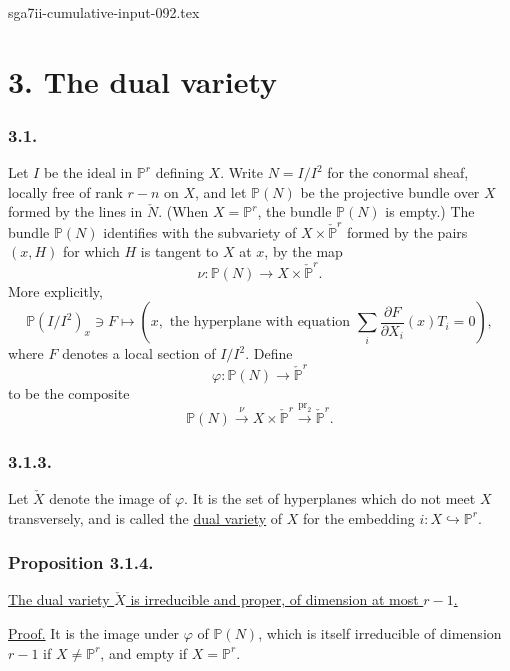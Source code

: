 \begin{filecontents*}{sga7ii-cumulative-input-092.tex}
\section*{3. The dual variety}

\subsubsection*{3.1.}
Let $I$ be the ideal in $\mathbb P^r$ defining $X$.  Write
$N=I/I^2$ for the conormal sheaf, locally free of rank $r-n$ on $X$,
and let $\mathbb P(N)$ be the projective bundle over $X$ formed by the
lines in $\check N$.  (When $X=\mathbb P^r$, the bundle
$\mathbb P(N)$ is empty.)  The bundle $\mathbb P(N)$ identifies with
the subvariety of $X\times\check{\mathbb P}^{r}$ formed by the pairs
$(x,H)$ for which $H$ is tangent to $X$ at $x$, by the map
\[
\nu:\mathbb P(N)\longrightarrow X\times\check{\mathbb P}^{r}.
\]
More explicitly,
\begin{equation}\tag{3.1.1}
\mathbb P(I/I^2)_x\ni F\longmapsto
\left(x,\text{ the hyperplane with equation }
\sum_i\frac{\partial F}{\partial X_i}(x)T_i=0\right),
\end{equation}
where $F$ denotes a local section of $I/I^2$.  Define
\begin{equation}\tag{3.1.2}
\varphi:\mathbb P(N)\longrightarrow\check{\mathbb P}^{r}
\end{equation}
to be the composite
\[
\mathbb P(N)\xrightarrow{\nu}
X\times\check{\mathbb P}^{r}
\xrightarrow{\operatorname{pr}_2}\check{\mathbb P}^{r}.
\]

\subsubsection*{3.1.3.}
Let $\check X$ denote the image of $\varphi$.  It is the set of
hyperplanes which do not meet $X$ transversely, and is called the
\underline{dual variety} of $X$ for the embedding
$i:X\hookrightarrow\mathbb P^r$.

\subsubsection*{Proposition 3.1.4.}
\underline{The dual variety $\check X$ is irreducible and proper, of
dimension at most $r-1$.}

\noindent\underline{Proof.}
It is the image under $\varphi$ of $\mathbb P(N)$, which is itself
irreducible of dimension $r-1$ if $X\ne\mathbb P^r$, and empty if
$X=\mathbb P^r$.


\end{filecontents*}

